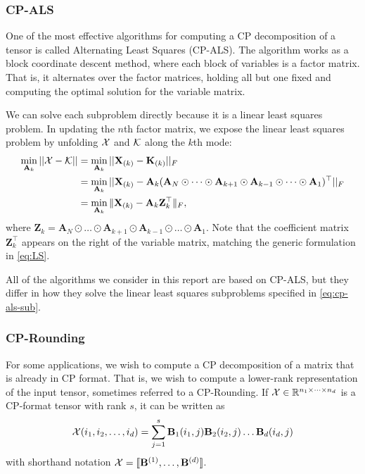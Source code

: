 \documentclass{article}
\newcommand{\mat}[1]{\mathbf{#1}}
\newcommand{\T}[2][]{#1{\mathbf{\cal{#2}}}} 						%
\begin{document}
\subsubsection{CP-ALS}

One of the most effective algorithms for computing a CP decomposition of a tensor is called Alternating Least Squares (CP-ALS).
The algorithm works as a block coordinate descent method, where each block of variables is a factor matrix.
That is, it alternates over the factor matrices, holding all but one fixed and computing the optimal solution for the variable matrix.

We can solve each subproblem directly because it is a linear least squares problem.
In updating the $n$th factor matrix, we expose the linear least squares problem by unfolding $\T{X}$ and $\T{K}$ along the $k$th mode:
\begin{align}
\label{eq:cp-als-sub}
\min_{\mat{A}_k}||\T{X} - \T{K}|| &= \min_{\mat{A}_k}||\mat{X}_{(k)} - \mat{K}_{(k)}||_F \notag \\ 
&=  \min_{\mat{A}_k}||\mat{X}_{(k)} - \mat{A}_k(\mat{A}_N \odot \dots \odot \mat{A}_{k+1} \odot \mat{A}_{k-1} \odot \dots \odot \mat{A}_1)^\top||_F \notag \\ 
&=  \min_{\mat{A}_k}\|\mat{X}_{(k)}-\mat{A}_k\mat{Z}_k^\top\|_F,
\end{align}
where $\mat{Z}_k=\mat{A}_N \odot \dots \odot \mat{A}_{k+1} \odot \mat{A}_{k-1} \odot \dots \odot \mat{A}_1$.
Note that the coefficient matrix $\mat{Z}_k^\top$ appears on the right of the variable matrix, matching the generic formulation in \cref{eq:LS}.

All of the algorithms we consider in this report are based on CP-ALS, but they differ in how they solve the linear least squares subproblems specified in \cref{eq:cp-als-sub}.

\subsubsection{CP-Rounding}
\label{sec:cp-rounding}

For some applications, we wish to compute a CP decomposition of a matrix that is already in CP format.
That is, we wish to compute a lower-rank representation of the input tensor, sometimes referred to a CP-Rounding.
If $\T{X} \in \mathbb{R}^{n_1 \times \dots \times n_d}$ is a CP-format tensor with rank $s$, it can be written as 
$$\T{X}(i_1,i_2,\dots, i_d) = \sum^{s}_{j=1} \mat{B}_1(i_1,j)\mat{B}_2(i_2,j) \dots \mat{B}_d(i_d,j)$$
with shorthand notation $\T{X} = [\![\mat{B}^{(1)}, \dots ,\mat{B}^{(d)}]\!]$.
\end{document}
